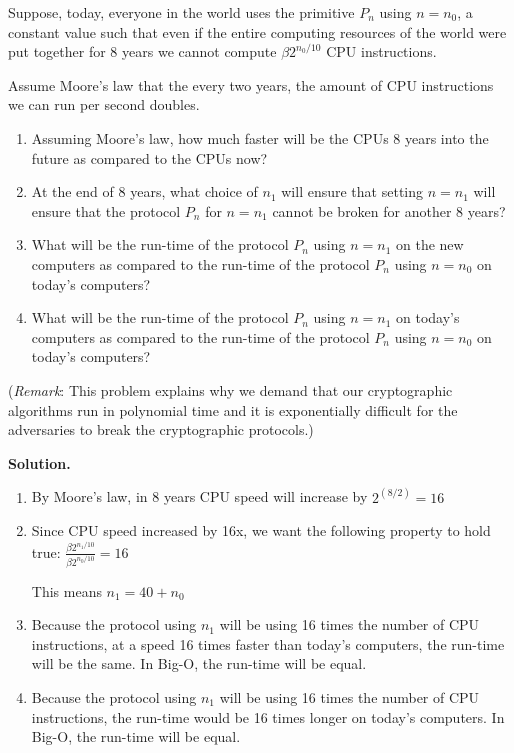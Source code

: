 \documentclass[11pt]{article}
\begin{document}
\begin{enumerate}
  Suppose, today, everyone in the world uses the primitive $P_n$ using $n=n_0$, a constant value such that even if the entire computing resources of the world were put together for 8 years we cannot compute $\beta 2^{n_0/10}$ CPU instructions. 
  
  Assume Moore's law that the every two years, the amount of CPU instructions we can run per second doubles. 
  
  \begin{enumerate}
  \item Assuming Moore's law, how much faster will be the CPUs 8 years into the future as compared to the CPUs now? 
  \item At the end of 8 years, what choice of $n_1$ will ensure that setting $n=n_1$ will ensure that the protocol $P_n$ for $n=n_1$ cannot be broken for another 8 years? 
  \item What will be the run-time of the protocol $P_n$ using $n=n_1$ on the new computers as compared to the run-time of the protocol $P_n$ using $n=n_0$ on today's computers? 
  \item What will be the run-time of the protocol $P_n$ using $n=n_1$ on today's computers as compared to the run-time of the protocol $P_n$ using $n=n_0$ on today's computers? 
  \end{enumerate}
  
  ({\footnotesize {\em Remark}: This problem explains why we demand that our cryptographic algorithms run in polynomial time and it is exponentially difficult for the adversaries to break the cryptographic protocols.})
    
  {\bfseries Solution.} 
  \begin{enumerate}
  \item By Moore's law, in 8 years CPU speed will increase by $2^(8/2) = 16$
  \item Since CPU speed increased by 16x, we want the following property to hold true: $\frac{\beta 2^{n_1/10}}{\beta 2^{n_0/10}} = 16$
  
  	This means $n_1 = 40 + n_0$
  \item Because the protocol using $n_1$ will be using 16 times the number of CPU instructions, at a speed 16 times faster than today's computers, the run-time will be the same. In Big-O, the run-time will be equal.
  \item Because the protocol using $n_1$ will be using 16 times the number of CPU instructions, the run-time would be 16 times longer on today's computers. In Big-O, the run-time will be equal.
  \end{enumerate}
    







\end{enumerate}
\end{document}
